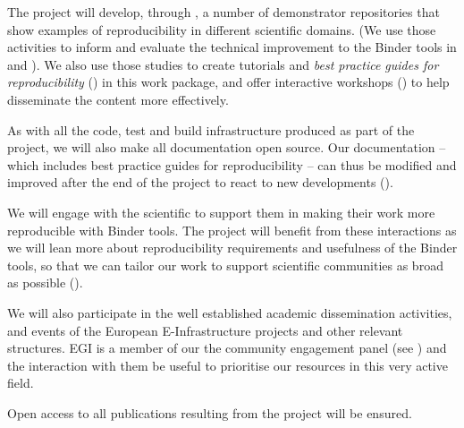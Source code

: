 \begin{workpackage}[id=education,wphases=0-36!1,swsites,
  title=Education and Dissemination,
  short=Education,
  lead=IFR,
  IFRRM=10,
  MPRM=6,
  SRLRM=7,
  QSRM=3,
  UIORM=9
]
\begin{wpdescription}
  The \TheProject project will develop, through , a number
  of demonstrator repositories that show examples of reproducibility in
  different scientific domains. (We use
  those activities to inform and evaluate the technical improvement to the
  Binder tools in  and ). We also use those
  studies to create tutorials and \emph{best practice guides for
    reproducibility} () in this work package, and
  offer interactive workshops () to help disseminate the
  content more effectively.

  As with all the code, test and build infrastructure produced as part of the
  project, we will also make all documentation open source. Our documentation --
  which includes best practice guides for reproducibility -- can thus be
  modified and improved after the end of the project to react to new
  developments ().

  We will engage with the scientific to support them in making their
  work more reproducible with Binder tools. The project will benefit from these interactions
  as we will lean more about reproducibility requirements and usefulness of the
  Binder tools, so that we can tailor our work to support scientific communities as broad as possible
  ().

  We will also participate in the well established academic dissemination
  activities, and events of the European E-Infrastructure projects and other
  relevant structures. EGI is a member of our the community engagement panel
  (see )
  and the interaction with them be useful to prioritise our resources in this
  very active field.

  Open access to all publications resulting from the project will be ensured.
\end{wpdescription}

\begin{tasklist}




\end{tasklist}



\end{workpackage}
